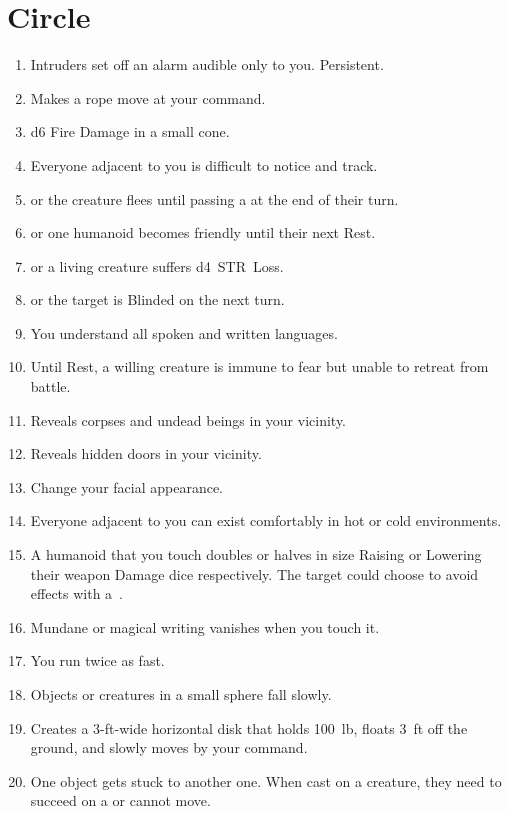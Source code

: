 \documentclass[itdr/core]{subfiles}
\begin{document}

\vfill
\break

\section{ Circle}
\def \spellcircle {1}
\begin{enumerate}
	\item {} Intruders set off an alarm audible only to you. Persistent.
	\item {} Makes a rope move at your command.
	\item {} d6 Fire Damage in a small cone.
	\item {} Everyone adjacent to you is difficult to notice and track.
	\item {}  or the creature flees until passing a  at the end of their turn.
	\item {}  or one humanoid becomes friendly until their next Rest.
	\item {}  or a living creature suffers d4~STR~Loss.
	\item {}  or the target is Blinded on the next turn.
	\item {} You understand all spoken and written languages.
	\item {} Until Rest, a willing creature is immune to fear but unable to retreat from battle.
	\item {} Reveals corpses and undead beings in your vicinity.
	\item {} Reveals hidden doors in your vicinity.
	\item {} Change your facial appearance.
	\item {} Everyone adjacent to you can exist comfortably in hot or cold environments.
	\item {} A humanoid that you touch doubles or halves in size Raising or Lowering their weapon Damage dice respectively. The target could choose to avoid effects with a~.\tight
	\item {} Mundane or magical writing vanishes when you touch it.
	\item {} You run twice as fast.
	\item {} Objects or creatures in a small sphere fall slowly.
	\item {} Creates a 3-ft-wide horizontal disk that holds 100~lb, floats 3~ft off the ground, and slowly moves by your command.
	\item {} One object gets stuck to another one. When cast on a creature, they need to succeed on a  or cannot move.
	

\end{enumerate}
\end{document}
